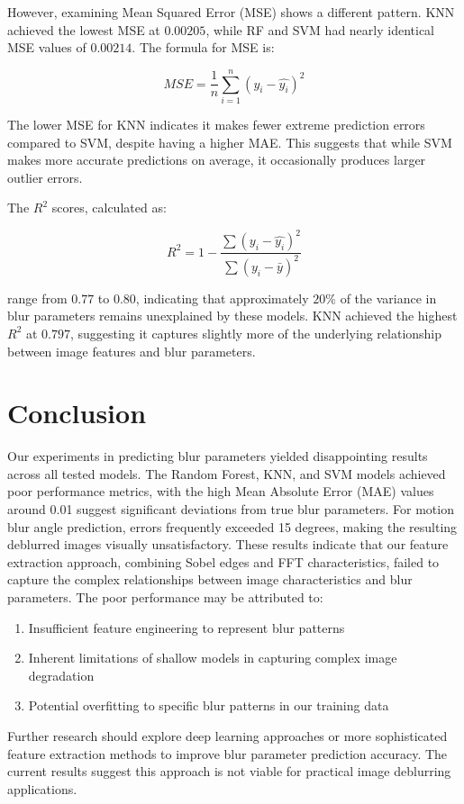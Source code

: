 \documentclass[twoside,11pt]{article}
\begin{document}
However, examining Mean Squared Error (MSE) shows a different pattern. KNN achieved the lowest MSE at $0.00205$, while RF and SVM had nearly identical MSE values of $0.00214$. The formula for MSE is:

$$
MSE = \frac{1}{n}\sum_{i=1}^{n}(y_i - \hat{y_i})^2
$$

The lower MSE for KNN indicates it makes fewer extreme prediction errors compared to SVM, despite having a higher MAE. This suggests that while SVM makes more accurate predictions on average, it occasionally produces larger outlier errors.

The $R^2$ scores, calculated as:

$$
R^2 = 1 - \frac{\sum(y_i - \hat{y_i})^2}{\sum(y_i - \bar{y})^2}
$$

range from $0.77$ to $0.80$, indicating that approximately $20\%$ of the variance in blur parameters remains unexplained by these models. KNN achieved the highest $R^2$ at $0.797$, suggesting it captures slightly more of the underlying relationship between image features and blur parameters.


\newpage
\section{Conclusion}

Our experiments in predicting blur parameters yielded disappointing results across all tested models. The Random Forest, KNN, and SVM models achieved poor performance metrics, with the high Mean Absolute Error (MAE) values around 0.01 suggest significant deviations from true blur parameters. For motion blur angle prediction, errors frequently exceeded 15 degrees, making the resulting deblurred images visually unsatisfactory. These results indicate that our feature extraction approach, combining Sobel edges and FFT characteristics, failed to capture the complex relationships between image characteristics and blur parameters. The poor performance may be attributed to:

\begin{enumerate}
  \item Insufficient feature engineering to represent blur patterns
  \item Inherent limitations of shallow models in capturing complex image degradation
  \item Potential overfitting to specific blur patterns in our training data
  \end{enumerate}

Further research should explore deep learning approaches or more sophisticated feature extraction methods to improve blur parameter prediction accuracy. The current results suggest this approach is not viable for practical image deblurring applications.

\FloatBarrier 

\newpage

\end{document}
